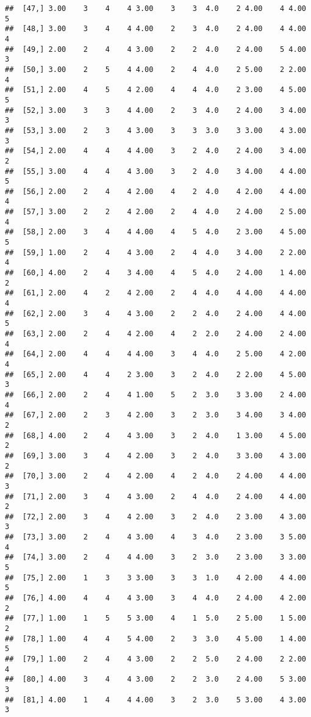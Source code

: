 \documentclass[]{article}
\begin{document}
\begin{verbatim}
##  [47,] 3.00    3    4    4 3.00    3    3  4.0    2 4.00    4 4.00    5
##  [48,] 3.00    3    4    4 4.00    2    3  4.0    2 4.00    4 4.00    4
##  [49,] 2.00    2    4    4 3.00    2    2  4.0    2 4.00    5 4.00    3
##  [50,] 3.00    2    5    4 4.00    2    4  4.0    2 5.00    2 2.00    4
##  [51,] 2.00    4    5    4 2.00    4    4  4.0    2 3.00    4 5.00    5
##  [52,] 3.00    3    3    4 4.00    2    3  4.0    2 4.00    3 4.00    3
##  [53,] 3.00    2    3    4 3.00    3    3  3.0    3 3.00    4 3.00    3
##  [54,] 2.00    4    4    4 4.00    3    2  4.0    2 4.00    3 4.00    2
##  [55,] 3.00    4    4    4 3.00    3    2  4.0    3 4.00    4 4.00    5
##  [56,] 2.00    2    4    4 2.00    4    2  4.0    4 2.00    4 4.00    4
##  [57,] 3.00    2    2    4 2.00    2    4  4.0    2 4.00    2 5.00    4
##  [58,] 2.00    3    4    4 4.00    4    5  4.0    2 3.00    4 5.00    5
##  [59,] 1.00    2    4    4 3.00    2    4  4.0    3 4.00    2 2.00    4
##  [60,] 4.00    2    4    3 4.00    4    5  4.0    2 4.00    1 4.00    2
##  [61,] 2.00    4    2    4 2.00    2    4  4.0    4 4.00    4 4.00    4
##  [62,] 2.00    3    4    4 3.00    2    2  4.0    2 4.00    4 4.00    5
##  [63,] 2.00    2    4    4 2.00    4    2  2.0    2 4.00    2 4.00    4
##  [64,] 2.00    4    4    4 4.00    3    4  4.0    2 5.00    4 2.00    4
##  [65,] 2.00    4    4    2 3.00    3    2  4.0    2 2.00    4 5.00    3
##  [66,] 2.00    2    4    4 1.00    5    2  3.0    3 3.00    2 4.00    4
##  [67,] 2.00    2    3    4 2.00    3    2  3.0    3 4.00    3 4.00    2
##  [68,] 4.00    2    4    4 3.00    3    2  4.0    1 3.00    4 5.00    2
##  [69,] 3.00    3    4    4 2.00    3    2  4.0    3 3.00    4 3.00    2
##  [70,] 3.00    2    4    4 2.00    4    2  4.0    2 4.00    4 4.00    3
##  [71,] 2.00    3    4    4 3.00    2    4  4.0    2 4.00    4 4.00    2
##  [72,] 2.00    3    4    4 2.00    3    2  4.0    2 3.00    4 3.00    3
##  [73,] 3.00    2    4    4 3.00    4    3  4.0    2 3.00    3 5.00    4
##  [74,] 3.00    2    4    4 4.00    3    2  3.0    2 3.00    3 3.00    5
##  [75,] 2.00    1    3    3 3.00    3    3  1.0    4 2.00    4 4.00    5
##  [76,] 4.00    4    4    4 3.00    3    4  4.0    2 4.00    4 2.00    2
##  [77,] 1.00    1    5    5 3.00    4    1  5.0    2 5.00    1 5.00    2
##  [78,] 1.00    4    4    5 4.00    2    3  3.0    4 5.00    1 4.00    5
##  [79,] 1.00    2    4    4 3.00    2    2  5.0    2 4.00    2 2.00    4
##  [80,] 4.00    3    4    4 3.00    2    2  3.0    2 4.00    5 3.00    3
##  [81,] 4.00    1    4    4 4.00    3    2  3.0    5 3.00    4 3.00    3

\end{verbatim}
\end{document}

